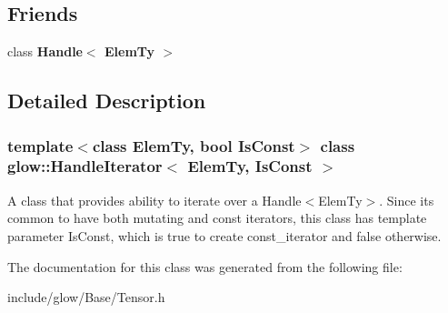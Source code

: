 \subsection*{Friends}
\begin{DoxyCompactItemize}
\item 
\mbox{\label{classglow_1_1_handle_iterator_ac1c93456ae7170c82eb77953671c9aa6}} 
class {\bfseries Handle$<$ Elem\+Ty $>$}
\end{DoxyCompactItemize}


\subsection{Detailed Description}
\subsubsection*{template$<$class Elem\+Ty, bool Is\+Const$>$\newline
class glow\+::\+Handle\+Iterator$<$ Elem\+Ty, Is\+Const $>$}

A class that provides ability to iterate over a Handle$<$\+Elem\+Ty$>$. Since it\textquotesingle{}s common to have both mutating and const iterators, this class has template parameter Is\+Const, which is true to create const\+\_\+iterator and false otherwise. 

The documentation for this class was generated from the following file\+:\begin{DoxyCompactItemize}
\item 
include/glow/\+Base/Tensor.\+h\end{DoxyCompactItemize}
